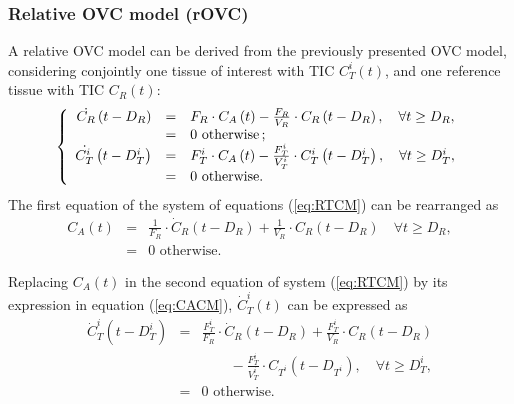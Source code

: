 \subsubsection{Relative OVC model (rOVC)}
A relative OVC model can be derived from the previously presented OVC model, considering conjointly one tissue of interest with TIC $C_T^i(t)$, and one reference tissue with TIC $C_R(t)$:
\begin{equation}
\left\{
\begin{array}{r c l}
\dot{C_R} \left( t - D_R \right) &=& F_R \cdot C_A \left( t \right) - \frac{F_R}{V_R} \cdot C_R \left( t - D_R \right), \quad \forall t \geq D_R,  \\
 &=& 0 \textrm{ otherwise\,;} \\
\dot{C_T^i} \left( t - D_T^i \right) &=& F_T^i \cdot C_A \left( t \right) - \frac{F_T^i}{V_T^i} \cdot C_T^i \left( t - D_T^i \right), \quad \forall t \geq D_T^i,  \\
 &=& 0 \textrm{ otherwise.}
\end{array}
\right.
\label{eq:RTCM}
\end{equation}
The first equation of the system of equations (\ref{eq:RTCM}) can be rearranged as
\begin{equation}
\begin{array}{rcl}
C_A(t) &=&\frac{1}{F_{R}} \cdot \dot{C}_{R}(t - D_{R}) + \frac{1}{V_{R}} \cdot {C_{R}}(t - D_R) \quad\forall t \geq D_{R}, \\
&=& \textrm{0 otherwise.}
\end{array}
\label{eq:CACM}
\end{equation}

Replacing $C_A(t)$ in the second equation of system (\ref{eq:RTCM}) by its expression in equation (\ref{eq:CACM}), $\dot{C}_T^i(t)$ can be expressed as
\begin{equation}
\begin{array}{rcl}
\dot{C}_T^i \left(t - D_T^i\right) &= & \frac{F_T^i}{F_{R}} \cdot \dot{C}_{R}\left(t-D_R\right) + \frac{F_T^i}{V_R} \cdot C_{R} \left(t - D_{R}\right)  \\
& & \qquad - \frac{F_T^i}{V_T^i} \cdot C_{T^i} \left(t - D_{T^i}\right), \quad \forall t \geq D_T^i,\\
&=& \textrm{0 otherwise.}
\end{array}
\label{eq:RTDEF1}
\end{equation}

